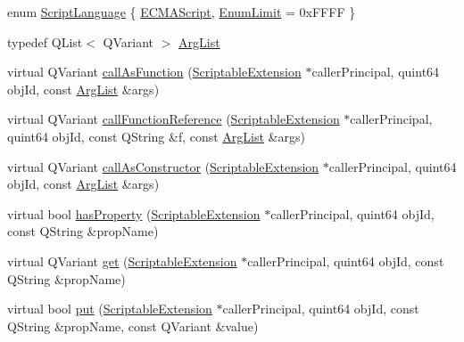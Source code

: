 \begin{DoxyCompactItemize}
\item 
enum \hyperlink{classKParts_1_1ScriptableExtension_ae24e9c2e1e132201ddc092b8b069be23}{\-Script\-Language} \{ \hyperlink{classKParts_1_1ScriptableExtension_ae24e9c2e1e132201ddc092b8b069be23a53f57a3152be4d9428e8ee66c0614882}{\-E\-C\-M\-A\-Script}, 
\hyperlink{classKParts_1_1ScriptableExtension_ae24e9c2e1e132201ddc092b8b069be23a0609cfd03f0802c4af4ccae88f385f67}{\-Enum\-Limit} =  0x\-F\-F\-F\-F
 \}
\item 
typedef \-Q\-List$<$ \-Q\-Variant $>$ \hyperlink{classKParts_1_1ScriptableExtension_a6a35540990153f08b6dcf55d4b504c02}{\-Arg\-List}
\item 
virtual \-Q\-Variant \hyperlink{classKParts_1_1ScriptableExtension_a77efc2bc6776fd1e75b1e1a971eed643}{call\-As\-Function} (\hyperlink{classKParts_1_1ScriptableExtension}{\-Scriptable\-Extension} $\ast$caller\-Principal, quint64 obj\-Id, const \hyperlink{classKParts_1_1ScriptableExtension_a6a35540990153f08b6dcf55d4b504c02}{\-Arg\-List} \&args)
\item 
virtual \-Q\-Variant \hyperlink{classKParts_1_1ScriptableExtension_a5fa3ad1c1fe03543b0c03884dc71c8da}{call\-Function\-Reference} (\hyperlink{classKParts_1_1ScriptableExtension}{\-Scriptable\-Extension} $\ast$caller\-Principal, quint64 obj\-Id, const \-Q\-String \&f, const \hyperlink{classKParts_1_1ScriptableExtension_a6a35540990153f08b6dcf55d4b504c02}{\-Arg\-List} \&args)
\item 
virtual \-Q\-Variant \hyperlink{classKParts_1_1ScriptableExtension_a9cb5d813d297719d8ee00fa703ece547}{call\-As\-Constructor} (\hyperlink{classKParts_1_1ScriptableExtension}{\-Scriptable\-Extension} $\ast$caller\-Principal, quint64 obj\-Id, const \hyperlink{classKParts_1_1ScriptableExtension_a6a35540990153f08b6dcf55d4b504c02}{\-Arg\-List} \&args)
\item 
virtual bool \hyperlink{classKParts_1_1ScriptableExtension_a5f1fce8473702a961d49957c307e7e67}{has\-Property} (\hyperlink{classKParts_1_1ScriptableExtension}{\-Scriptable\-Extension} $\ast$caller\-Principal, quint64 obj\-Id, const \-Q\-String \&prop\-Name)
\item 
virtual \-Q\-Variant \hyperlink{classKParts_1_1ScriptableExtension_a90f5b0047ddb0b78096cab68a40c6326}{get} (\hyperlink{classKParts_1_1ScriptableExtension}{\-Scriptable\-Extension} $\ast$caller\-Principal, quint64 obj\-Id, const \-Q\-String \&prop\-Name)
\item 
virtual bool \hyperlink{classKParts_1_1ScriptableExtension_ad7cbeb6e9c0a92909e83d71e0646b5cd}{put} (\hyperlink{classKParts_1_1ScriptableExtension}{\-Scriptable\-Extension} $\ast$caller\-Principal, quint64 obj\-Id, const \-Q\-String \&prop\-Name, const \-Q\-Variant \&value)

\end{DoxyCompactItemize}
